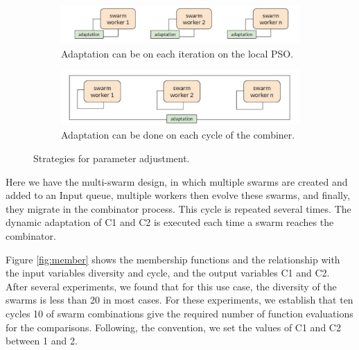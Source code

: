 \documentclass[runningheads]{llncs}
\begin{document}
\begin{figure}[htbp]
  \centering
  \begin{subfigure}{0.8\textwidth}
    \includegraphics[angle=0,width=1\textwidth]{adaptation local.pdf}
    \caption{Adaptation can be on each iteration on the local PSO.}
    \label{fig:adap_local} 
  \end{subfigure}

  \begin{subfigure}{0.8\textwidth}
     \includegraphics[angle=0,width=1\textwidth]{adaptation combiner.pdf}
     \caption{Adaptation can be done on each cycle of the combiner.}
     \label{fig:adap_combiner} 
  \end{subfigure}
\caption{Strategies for parameter adjustment.}
\label{fig:adap}
\end{figure}

Here we have the multi-swarm design, in which multiple swarms are created and added to an Input queue, multiple workers then evolve these swarms, and finally, they migrate in the combinator process. This cycle is repeated several times. The dynamic adaptation of C1 and C2 is executed each time a swarm reaches the combinator.

Figure \ref{fig:member} shows the membership functions and the relationship with the input variables diversity and cycle, and the output variables C1 and C2. After several experiments, we found that for this use case, the diversity of the swarms is less than 20 in most cases. For these experiments, we establish that ten cycles 10 of swarm combinations give the required number of function evaluations for the comparisons. Following, the convention, we set the values of C1 and C2 between 1 and 2.
\end{document}

